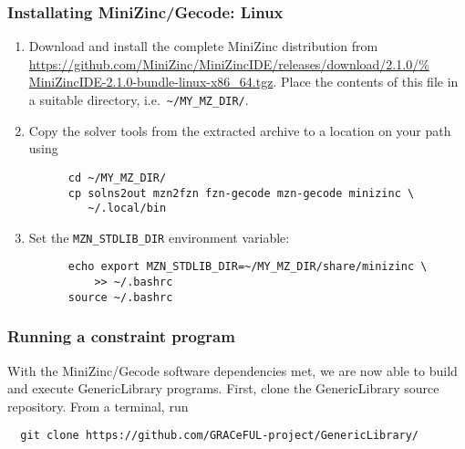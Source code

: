 
\subsubsection{Installating MiniZinc/Gecode: Linux} 

\begin{enumerate}
  \item Download and install the complete MiniZinc distribution from
    \url{https://github.com/MiniZinc/MiniZincIDE/releases/download/2.1.0/%
    MiniZincIDE-2.1.0-bundle-linux-x86_64.tgz}. Place the contents of this file 
    in a suitable directory, i.e.\ \verb+~/MY_MZ_DIR/+.
  \item Copy the solver tools from the extracted archive to a location on your
    path using

    \begin{verbatim}
      cd ~/MY_MZ_DIR/
      cp solns2out mzn2fzn fzn-gecode mzn-gecode minizinc \
         ~/.local/bin
    \end{verbatim}

  \item Set the \verb+MZN_STDLIB_DIR+ environment variable:

    \begin{verbatim}
      echo export MZN_STDLIB_DIR=~/MY_MZ_DIR/share/minizinc \
          >> ~/.bashrc
      source ~/.bashrc
    \end{verbatim}
\end{enumerate}


\subsubsection{Running a constraint program} 

With the MiniZinc/Gecode software dependencies met, we are now able to build and
execute GenericLibrary programs. First, clone the GenericLibrary source 
repository. From a terminal, run

\begin{verbatim}
  git clone https://github.com/GRACeFUL-project/GenericLibrary/
\end{verbatim}

